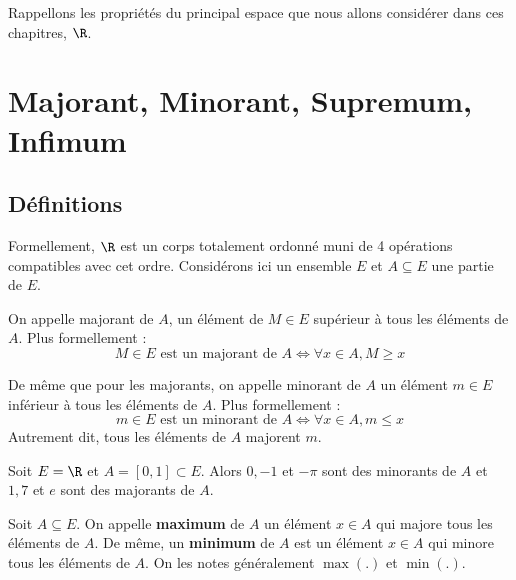 
Rappellons les propriétés du principal espace que nous allons considérer dans ces chapitres, $\R$. 


\section{Majorant, Minorant, Supremum, Infimum}

\subsection{Définitions}

Formellement, $\R$ est un corps totalement ordonné muni de 4 opérations compatibles avec cet ordre. 
Considérons ici un ensemble $E$ et $A \subseteq E$ une partie de $E$. 

\begin{definition}[Majorant]
    On appelle majorant de $A$, un élément de $M \in E$ supérieur à tous les éléments de $A$. 
    Plus formellement :
        \[ M \in E \text{ est un majorant de } A \iff \forall x \in A, M \geqslant x \] 
\end{definition}

\begin{definition}[Minorant]
    De même que pour les majorants, on appelle minorant de $A$ un élément $m \in E$ inférieur à tous les éléments de $A$. 
    Plus formellement :
        \[ m \in E \text{ est un minorant de } A \iff \forall x \in A, m \leqslant x \] 
    Autrement dit, tous les éléments de $A$ majorent $m$.
\end{definition}

\begin{example}
    Soit $E = \R$ et $A = [0,1] \subset E$. Alors $0,-1$ et $-\pi$ sont des minorants de $A$
    et $1, 7$ et $ e$ sont des majorants de $A$. 
\end{example}

\begin{definition}
    Soit $A \subseteq E$. On appelle \textbf{maximum} de $A$ un élément $x \in A$ qui majore tous les éléments de $A$. 
    De même, un \textbf{minimum} de $A$ est un élément $x \in A$ qui minore tous les éléments de $A$. 
    On les notes généralement $\max(.)$ et $\min(.)$.
\end{definition}

